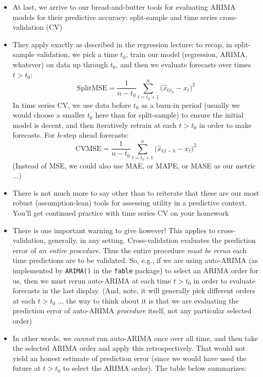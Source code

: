 \documentclass{article}
\begin{document}
\def\SplitMSE{\mathrm{SplitMSE}} 
\def\CVMSE{\mathrm{CVMSE}}

\begin{itemize}
\item At last, we arrive to our bread-and-butter tools for evaluating ARIMA  
  models for their predictive accuracy: split-sample and time series
  cross-validation (CV)

\item They apply exactly as described in the regression lecture: to recap, in
  split-sample validation, we pick a time $t_0$, train our model (regression,
  ARIMA, whatever) on data up through $t_0$, and then we evaluate forecasts  
   over times $t > t_0$:
  \[
  \SplitMSE = \frac{1}{n-t_0} \sum_{t = t_0+1}^n \big( \hat{x}_{t | t_0} - x_t
  \big)^2   
  \]
  In time series CV, we use data before $t_0$ as a burn-in period (usually we
  would choose a smaller $t_0$ here than for split-sample) to ensure the initial
  model is decent, and then iteratively retrain at each $t > t_0$ in order to
  make forecasts. For $h$-step ahead forecasts:    
  \[
  \CVMSE = \frac{1}{n-t_0} \sum_{t = t_0+1}^n \big( \hat{x}_{t | t-h} - x_t
  \big)^2    
  \]
  (Instead of MSE, we could also use MAE, or MAPE, or MASE as our metric ...) 

\item There is not much more to say other than to reiterate that these are our
  most robust (assumption-lean) tools for assessing utility in a predictive 
  context. You'll get continued practice with time series CV on your homework

\item There is one important warning to give however! This applies to
  cross-validation, generally, in any setting. Cross-validation evaluates the
  prediction error of \emph{an entire procedure}. Thus the entire procedure
  \emph{must be rerun} each time predictions are to be validated. So, e.g., if
  we are using auto-ARIMA (as implemented by \verb|ARIMA()| in the \verb|fable|
  package) to select an ARIMA order for us, then we must rerun auto-ARIMA at
  each time $t > t_0$ in order to evaluate forecasts in the last display. (And,
  note, it will generally pick different orders at each $t > t_0$ ... the way to
  think about it is that we are evaluating the prediction error of auto-ARIMA 
  \emph{procedure} itself, not any particular selected order) 

\item In other words, we \emph{cannot} run auto-ARIMA once over all time, and
  then take the selected ARIMA order and apply this retrospectively. That would
  not yield an honest estimate of prediction error (since we would have used the 
  future at $t > t_0$ to select the ARIMA order). The table below
  summarizes:


\end{itemize}
\end{document}
